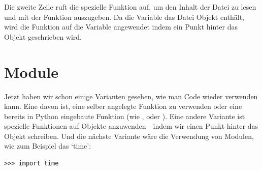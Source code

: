 \par
Die zweite Zeile ruft die spezielle Funktion  auf, um den Inhalt der Datei zu lesen und mit der  Funktion auszugeben. Da die Variable  das Datei Objekt enthält, wird die  Funktion auf die  Variable angewendet indem ein Punkt hinter das Objekt geschrieben wird.


\section{Module}

Jetzt haben wir schon einige Varianten gesehen, wie man Code wieder verwenden kann. Eine davon ist, eine selber angelegte Funktion zu verwenden oder eine bereits in Python eingebaute Funktion (wie ,  oder ). Eine andere Variante ist spezielle Funktionen auf Objekte anzuwenden---indem wir einen Punkt hinter das Objekt schreiben. Und die nächste Variante wäre die Verwendung von Modulen, wie zum Beispiel das `time':

\begin{Verbatim}[frame=single]
>>> import time
\end{Verbatim}

